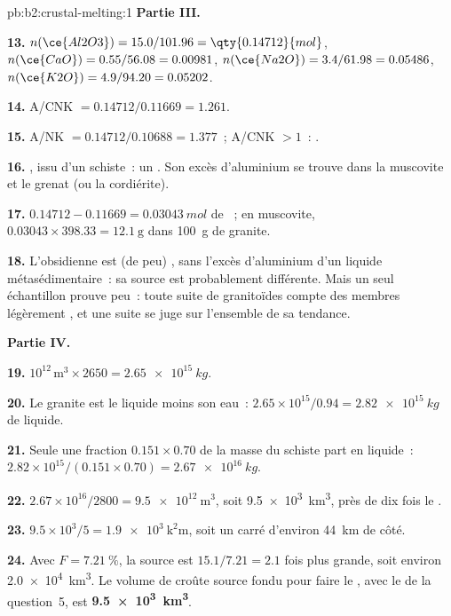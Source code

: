\begin{solution}{pb:b2:crustal-melting:1}
\noindent\textbf{Partie III.}

\textbf{13.} $n(\ce{Al2O3}) = 15.0/101.96 = \qty{0.14712}{mol}$, $n(\ce{CaO}) =
0.55/56.08 = 0.00981$, $n(\ce{Na2O}) = 3.4/61.98 = 0.05486$, $n(\ce{K2O}) = 4.9/94.20 =
0.05202$.

\textbf{14.} A/CNK $= 0.14712/0.11669 = 1.261$.

\textbf{15.} A/NK $= 0.14712/0.10688 = 1.377$~; A/CNK $> 1$~: .

\textbf{16.} , issu d'un schiste~: un . Son excès d'aluminium se trouve dans
la muscovite et le grenat (ou la cordiérite).

\textbf{17.} $0.14712 - 0.11669 = \qty{0.03043}{mol}$ de ~; en muscovite,
$0.03043\times398.33 = \qty{12.1}{\gram}$ dans \qty{100}{\gram} de granite.

\textbf{18.} L'obsidienne est (de peu) , sans l'excès d'aluminium d'un liquide
métasédimentaire~: sa source est probablement différente. Mais un seul échantillon prouve peu~:
toute suite de granitoïdes compte des membres légèrement , et une suite se juge sur
l'ensemble de sa tendance.

\noindent\textbf{Partie IV.}

\textbf{19.} $10^{12}\,\unit{\cubic\metre}\times2650 = \qty{2.65e15}{kg}$.

\textbf{20.} Le granite est le liquide moins son eau~: $2.65\times10^{15}/0.94 =
\qty{2.82e15}{kg}$ de liquide.

\textbf{21.} Seule une fraction $0.151\times0.70$ de la masse du schiste part en liquide~:
$2.82\times10^{15}/(0.151\times0.70) = \qty{2.67e16}{kg}$.

\textbf{22.} $2.67\times10^{16}/2800 = \qty{9.5e12}{\cubic\metre}$, soit
\qty{9.5e3}{\cubic\kilo\metre}, près de dix fois le .

\textbf{23.} $9.5\times10^3/5 = \qty{1.9e3}{\square\kilo\metre}$, soit un carré d'environ
\qty{44}{km} de côté.

\textbf{24.} Avec $F = \qty{7.21}{\percent}$, la source est $15.1/7.21 = 2.1$ fois
plus grande, soit environ \qty{2.0e4}{\cubic\kilo\metre}. Le volume de croûte source fondu pour faire
le , avec le  de la question~5, est
\textbf{\qty[text-series-to-math=true]{9.5e3}{\cubic\kilo\metre}}.
\end{solution}

